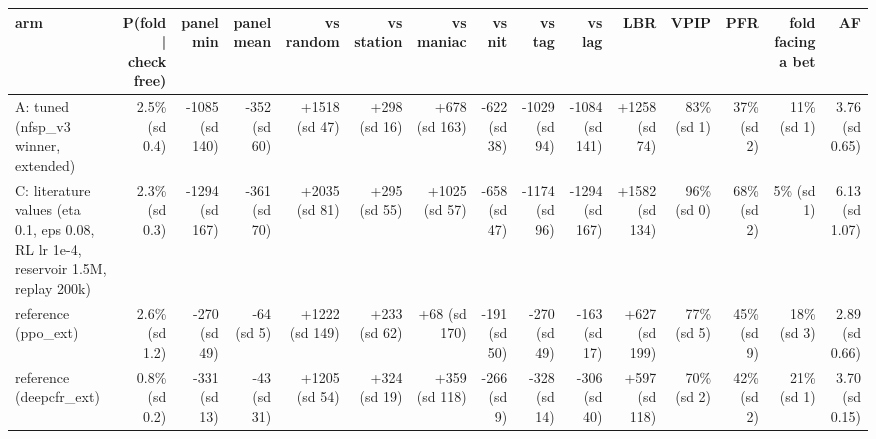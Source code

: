 \begin{tabular}{lrrrrrrrrrrrrrr}
\toprule
arm & P(fold | check free) & panel min & panel mean & vs random & vs station & vs maniac & vs nit & vs tag & vs lag & LBR & VPIP & PFR & fold facing a bet & AF \\
\midrule
A: tuned (nfsp\_v3 winner, extended) & 2.5\% (sd 0.4) & -1085 (sd 140) & -352 (sd 60) & +1518 (sd 47) & +298 (sd 16) & +678 (sd 163) & -622 (sd 38) & -1029 (sd 94) & -1084 (sd 141) & +1258 (sd 74) & 83\% (sd 1) & 37\% (sd 2) & 11\% (sd 1) & 3.76 (sd 0.65) \\
C: literature values (eta 0.1, eps 0.08, RL lr 1e-4, reservoir 1.5M, replay 200k) & 2.3\% (sd 0.3) & -1294 (sd 167) & -361 (sd 70) & +2035 (sd 81) & +295 (sd 55) & +1025 (sd 57) & -658 (sd 47) & -1174 (sd 96) & -1294 (sd 167) & +1582 (sd 134) & 96\% (sd 0) & 68\% (sd 2) & 5\% (sd 1) & 6.13 (sd 1.07) \\
reference (ppo\_ext) & 2.6\% (sd 1.2) & -270 (sd 49) & -64 (sd 5) & +1222 (sd 149) & +233 (sd 62) & +68 (sd 170) & -191 (sd 50) & -270 (sd 49) & -163 (sd 17) & +627 (sd 199) & 77\% (sd 5) & 45\% (sd 9) & 18\% (sd 3) & 2.89 (sd 0.66) \\
reference (deepcfr\_ext) & 0.8\% (sd 0.2) & -331 (sd 13) & -43 (sd 31) & +1205 (sd 54) & +324 (sd 19) & +359 (sd 118) & -266 (sd 9) & -328 (sd 14) & -306 (sd 40) & +597 (sd 118) & 70\% (sd 2) & 42\% (sd 2) & 21\% (sd 1) & 3.70 (sd 0.15) \\
\bottomrule
\end{tabular}
